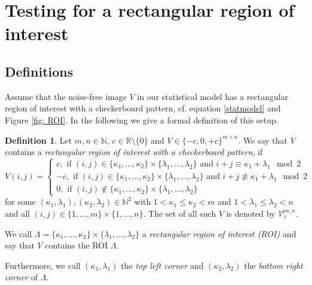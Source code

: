 \documentclass[a4paper,12pt]{article}
\theoremstyle{plain}
\theoremstyle{definition}
\newtheorem{definition}[theorem]{Definition}
\numberwithin{equation}{section}
\begin{document}
\newpage



\section{Testing for a rectangular region of interest}

\subsection{Definitions}\label{section: definitions}

Assume that the noise-free image $V$ in our statistical model has a rectangular region of interest with a checkerboard pattern, cf. equation \eqref{statmodel} and Figure \ref{fig: ROI}. In the following we give a formal definition of this setup.

\begin{definition}\label{def: ROIcheckerboard}
	Let $m, n \in \mathbb{N}$, $c \in \mathbb{R} \setminus \{ 0 \}$ and $V \in \{ -c, 0, + c \}^{m \times n}$. We say that $V$ contains a \emph{rectangular region of interest with a checkerboard pattern}, if
	\begin{equation}
		V(i, j) =
		\begin{cases}
			c, \textrm{ if } (i, j) \in \{ \kappa_1, \dots, \kappa_2 \} \times \{ \lambda_1, \dots, \lambda_2 \} \textrm{ and } i + j \equiv \kappa_1 + \lambda_1 \mod 2 \\
			-c, \textrm{ if } (i, j) \in \{ \kappa_1, \dots, \kappa_2 \} \times \{ \lambda_1, \dots, \lambda_2 \} \textrm{ and } i + j \not\equiv \kappa_1 + \lambda_1 \mod 2 \\
			0, \textrm{ if } (i, j) \notin \{ \kappa_1, \dots, \kappa_2 \} \times \{ \lambda_1, \dots, \lambda_2 \}
		\end{cases}
	\end{equation}
	for some $(\kappa_1, \lambda_1), (\kappa_2, \lambda_2) \in \mathbb{N}^2$ with $1 < \kappa_1 \leq \kappa_2 < m$ and $1 < \lambda_1 \leq \lambda_2 < n$ and all $(i, j) \in \{ 1, \dots, m \} \times \{ 1, \dots, n \}$. The set of all such $V$ is denoted by $\mathcal{V}_c^{m, n}$.
	
	We call $\varLambda = \{ \kappa_1, \dots, \kappa_2 \} \times \{ \lambda_1, \dots, \lambda_2 \}$ a \emph{rectangular region of interest (ROI)} and say that $V$ contains the ROI $\varLambda$.
	
	Furthermore, we call $(\kappa_1, \lambda_1)$ the \emph{top left corner} and $(\kappa_2, \lambda_2)$ the \emph{bottom right corner} of $\varLambda$.
\end{definition}
\end{document}
